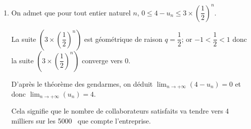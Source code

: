 \documentclass[10pt]{article}
\providecommand{\np}[2][]{{#2~#1}}
\providecommand{\ds}{\displaystyle}
\begin{document}
\begin{enumerate}
\begin{enumerate}

On a donc démontré que pour tout $n$, on a: $0 \leqslant u_n \leqslant  u_{n+1}  \leqslant  4$.
		
		\item 
{}

La suite $(u_n)$ est croissante et majorée donc, d'après le théorème de la convergence monotone, la suite $(u_n)$ est convergente.

	\end{enumerate}
	
\item On admet que pour tout entier naturel $n$,
$0  \leqslant 4 - u_n \leqslant 3 \times \left(\dfrac{1}{2}\right)^n$.

La suite $ \left (3 \times \left(\dfrac{1}{2}\right)^n\right )$ est géométrique de raison $q=\dfrac{1}{2}$; or $-1<\dfrac{1}{2}<1$ donc la suite $ \left (3 \times \left(\dfrac{1}{2}\right)^n\right )$ converge vers 0.

D'après le théorème des gendarmes, on déduit
$\ds\lim_{n \to +\infty} \left (4 - u_n \right )=0$
et donc $\ds\lim_{n \to +\infty} \left ( u_n \right )=4$.



Cela signifie que le nombre de collaborateurs satisfaits va tendre vers 4 milliers sur les \np{5000} que compte l'entreprise.

\end{enumerate}

\bigskip
\end{document}
